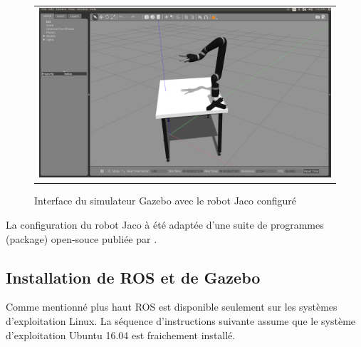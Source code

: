 \documentclass[root.tex]{subfiles}
\begin{document}
\begin{figure}
 \begin{center}
  \begin{tabular}{c}
    \includegraphics[trim=0cm 0cm 0cm 0cm, scale=0.25]{gazebo_jaco.png}
  \end{tabular}
 \end{center}
\caption{Interface du simulateur Gazebo avec le robot Jaco configuré}
 \label{fig:gazebo_jaco}
\end{figure}

La configuration du robot Jaco à été adaptée d'une suite de programmes (package) open-souce publiée par \cite{jaco_github}.

\subsection{Installation de ROS et de Gazebo}

Comme mentionné plus haut ROS est disponible seulement sur les systèmes d'exploitation Linux.
La séquence d'instructions suivante assume que le système d'exploitation Ubuntu 16.04 est fraichement installé.
\end{document}

